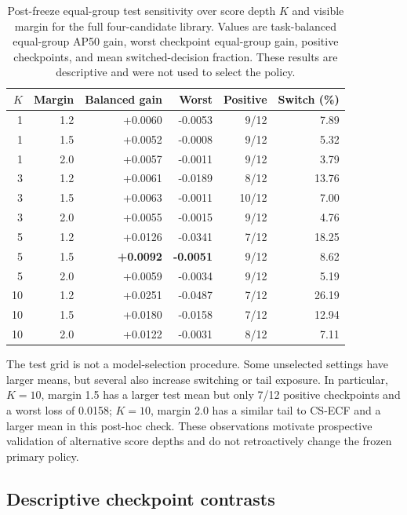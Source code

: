 \documentclass[11pt]{article}
\begin{document}
\begin{table}[ht]
\centering
\small
\caption{Post-freeze equal-group test sensitivity over score depth \(K\) and
visible margin for the full four-candidate library. Values are task-balanced
equal-group AP50 gain, worst checkpoint equal-group gain, positive checkpoints,
and mean switched-decision fraction. These results are descriptive and were
not used to select the policy.}
\label{tab:test-grid}
\begin{tabular}{@{}rrrrrr@{}}
\toprule
\(K\) & Margin & Balanced gain & Worst & Positive & Switch (\%) \\
\midrule
1 & 1.2 & +0.0060 & -0.0053 & 9/12 & 7.89 \\
1 & 1.5 & +0.0052 & -0.0008 & 9/12 & 5.32 \\
1 & 2.0 & +0.0057 & -0.0011 & 9/12 & 3.79 \\
3 & 1.2 & +0.0061 & -0.0189 & 8/12 & 13.76 \\
3 & 1.5 & +0.0063 & -0.0011 & 10/12 & 7.00 \\
3 & 2.0 & +0.0055 & -0.0015 & 9/12 & 4.76 \\
5 & 1.2 & +0.0126 & -0.0341 & 7/12 & 18.25 \\
5 & 1.5 & \textbf{+0.0092} & \textbf{-0.0051} & 9/12 & 8.62 \\
5 & 2.0 & +0.0059 & -0.0034 & 9/12 & 5.19 \\
10 & 1.2 & +0.0251 & -0.0487 & 7/12 & 26.19 \\
10 & 1.5 & +0.0180 & -0.0158 & 7/12 & 12.94 \\
10 & 2.0 & +0.0122 & -0.0031 & 8/12 & 7.11 \\
\bottomrule
\end{tabular}
\end{table}

The test grid is not a model-selection procedure. Some unselected settings
have larger means, but several also increase switching or tail exposure. In
particular, \(K=10\), margin 1.5 has a larger test mean but only 7/12 positive
checkpoints and a worst loss of 0.0158; \(K=10\), margin 2.0 has a similar
tail to CS-ECF and a larger mean in this post-hoc check. These observations
motivate prospective validation of alternative score depths and do not
retroactively change the frozen primary policy.

\subsection{Descriptive checkpoint contrasts}
\end{document}
